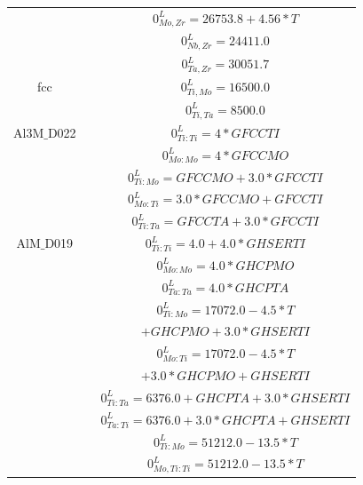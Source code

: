 \begin{longtable}[H]{ c c c }
                  & \cite{Perez2003} & $0^\textit{L}_{Mo,Zr} = 26753.8+4.56*T$\\
                  & \cite{Guillermet1991} & $0^\textit{L}_{Nb,Zr} = 24411.0$\\
                  & \cite{Guillermet1995} & $0^\textit{L}_{Ta,Zr} = 30051.7$\\
           fcc & \cite{Ansara1998} & $0^\textit{L}_{Ti,Mo} = 16500.0$\\
                  & \cite{Ansara1998} & $0^\textit{L}_{Ti,Ta} = 8500.0$\\
    Al3M$\_$D022 & \cite{Ansara1998} & $0^\textit{L}_{Ti:Ti} = 4*GFCCTI$\\
                            & \cite{Ansara1998} & $0^\textit{L}_{Mo:Mo} = 4*GFCCMO$\\
                            & \cite{Ansara1998} & $0^\textit{L}_{Ti:Mo} = GFCCMO+3.0*GFCCTI$\\
                            & \cite{Ansara1998} & $0^\textit{L}_{Mo:Ti} = 3.0*GFCCMO+GFCCTI$\\
                            & \cite{Ansara1998} & $0^\textit{L}_{Ti:Ta} = GFCCTA+3.0*GFCCTI$\\
         AlM$\_$D019 & \cite{Ansara1998} & $0^\textit{L}_{Ti:Ti} = 4.0+4.0*GHSERTI$\\
                              & \cite{Ansara1998} & $0^\textit{L}_{Mo:Mo} = 4.0*GHCPMO$\\
                              & \cite{Ansara1998} & $0^\textit{L}_{Ta:Ta} = 4.0*GHCPTA$\\
                              & \cite{Ansara1998} & $0^\textit{L}_{Ti:Mo} = 17072.0-4.5*T$\\
                              &                             & $+GHCPMO+3.0*GHSERTI$\\
                              & \cite{Ansara1998} & $0^\textit{L}_{Mo:Ti} = 17072.0-4.5*T$\\
                              &                             & $+3.0*GHCPMO+GHSERTI$\\
                              & \cite{Ansara1998} & $0^\textit{L}_{Ti:Ta} = 6376.0+GHCPTA+3.0*GHSERTI$\\
                              & \cite{Ansara1998} & $0^\textit{L}_{Ta:Ti} = 6376.0+3.0*GHCPTA+GHSERTI$\\
                              & \cite{Ansara1998} & $0^\textit{L}_{Ti:Mo} = 51212.0-13.5*T$\\
                              & \cite{Ansara1998} & $0^\textit{L}_{Mo,Ti:Ti} = 51212.0-13.5*T$\\

\end{longtable}
